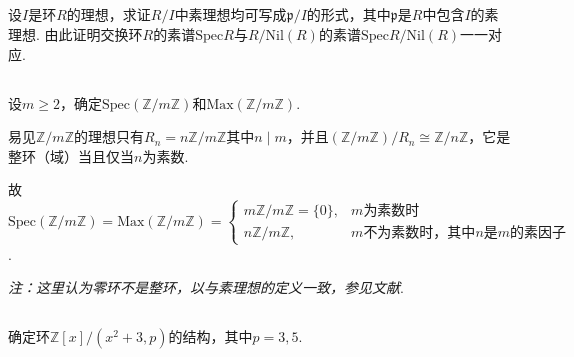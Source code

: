 \subsection{}
设$I$是环$R$的理想，求证$R/I$中素理想均可写成$\mathfrak{p}/I$的形式，其中$\mathfrak{p}$是$R$中包含$I$的素理想. 由此证明交换环$R$的素谱$\mathrm{Spec}R$与$R/\mathrm{Nil}(R)$的素谱$\mathrm{Spec}R/\mathrm{Nil}(R)$一一对应.


\subsection{}
设$m\geq 2$，确定$\mathrm{Spec}(\mathbb{Z}/m\mathbb{Z})$和$\mathrm{Max}(\mathbb{Z}/m\mathbb{Z})$.

\jie 易见$\mathbb{Z}/m\mathbb{Z}$的理想只有$R_n=n\mathbb{Z}/m\mathbb{Z}$其中$n\mid m$，并且$(\mathbb{Z}/m\mathbb{Z})/R_n\cong\mathbb{Z}/n\mathbb{Z}$，它是整环（域）当且仅当$n$为素数.

故$\mathrm{Spec}(\mathbb{Z}/m\mathbb{Z})=\mathrm{Max}(\mathbb{Z}/m\mathbb{Z})
=\begin{cases}
m\mathbb{Z}/m\mathbb{Z}=\{0\}, & m\text{为素数时}\\
n\mathbb{Z}/m\mathbb{Z}, &m\text{不为素数时，其中}n\text{是}m\text{的素因子}
\end{cases}
$.

\emph{注：这里认为零环不是整环，以与素理想的定义一致，参见文献}\cite{1326600}.

\subsection{}
确定环$\mathbb{Z}[x]/(x^2+3, p)$的结构，其中$p=3,5$.

